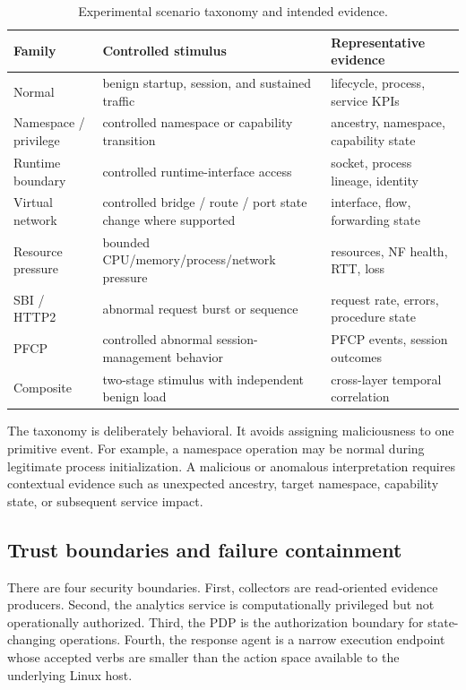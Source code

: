 \documentclass[sigconf,review]{acmart}
\begin{document}
\begin{table}[t]
\caption{Experimental scenario taxonomy and intended evidence.}
\label{tab:taxonomy}
\centering\scriptsize
\setlength{\tabcolsep}{2.7pt}
\renewcommand{\arraystretch}{1.07}
\begin{tabularx}{\columnwidth}{>{\raggedright\arraybackslash}p{} >{\raggedright\arraybackslash}p{} X}
\toprule
Family & Controlled stimulus & Representative evidence \\
\midrule
Normal & benign startup, session, and sustained traffic & lifecycle, process, service KPIs \\
Namespace / privilege & controlled namespace or capability transition & ancestry, namespace, capability state \\
Runtime boundary & controlled runtime-interface access & socket, process lineage, identity \\
Virtual network & controlled bridge / route / port state change where supported & interface, flow, forwarding state \\
Resource pressure & bounded CPU/memory/process/network pressure & resources, NF health, RTT, loss \\
SBI / HTTP2 & abnormal request burst or sequence & request rate, errors, procedure state \\
PFCP & controlled abnormal session-management behavior & PFCP events, session outcomes \\
Composite & two-stage stimulus with independent benign load & cross-layer temporal correlation \\
\bottomrule
\end{tabularx}
\end{table}

The taxonomy is deliberately behavioral. It avoids assigning maliciousness to one primitive event. For example, a namespace operation may be normal during legitimate process initialization. A malicious or anomalous interpretation requires contextual evidence such as unexpected ancestry, target namespace, capability state, or subsequent service impact.

\subsection{Trust boundaries and failure containment}
There are four security boundaries. First, collectors are read-oriented evidence producers. Second, the analytics service is computationally privileged but not operationally authorized. Third, the PDP is the authorization boundary for state-changing operations. Fourth, the response agent is a narrow execution endpoint whose accepted verbs are smaller than the action space available to the underlying Linux host.
\end{document}
